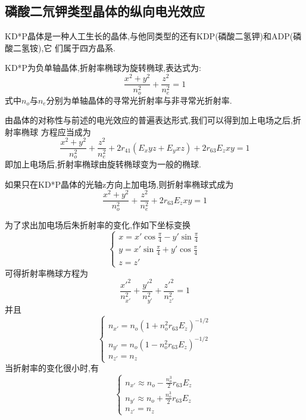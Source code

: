 \documentclass[aps,pre,12pt,preprint,onecolumn,showpacs,showkeys]{revtex4-1}
\begin{document}
\subsection{磷酸二氘钾类型晶体的纵向电光效应}

KD*P晶体是一种人工生长的晶体,与他同类型的还有KDP(磷酸二氢钾)和ADP(磷酸二氢铵),它
们属于四方晶系.

KD*P为负单轴晶体,折射率椭球为旋转椭球,表达式为:
\begin{equation}
    \frac{x^2 + y^2}{n_o^2} + \frac{z^2}{n_e^2} = 1
\end{equation}
式中$n_o$与$n_e$分别为单轴晶体的寻常光折射率与非寻常光折射率.

由晶体的对称性与前述的电光效应的普遍表达形式,我们可以得到加上电场之后,折射率椭球
方程应当成为
\begin{equation}
    \frac{x^2 + y^2}{n_o^2} + \frac{z^2}{n_e^2} + 2r_{41}(E_xyz + E_yxz) +
    2r_{63}E_zxy = 1
\end{equation}
即加上电场后,折射率椭球由旋转椭球变为一般的椭球.

如果只在KD*P晶体的光轴z方向上加电场,则折射率椭球式成为
\begin{equation}
    \frac{x^2 + y^2}{n_o^2} + \frac{z^2}{n_e^2} + 2r_{63}E_zxy = 1
\end{equation}

为了求出加电场后朱折射率的变化,作如下坐标变换
\begin{equation}
    \begin{cases}
        x = x'\cos{\frac{\pi}{4}} - y'\sin{\frac{\pi}{4}} \\
        y = x'\sin{\frac{\pi}{4}} + y'\cos{\frac{\pi}{4}} \\
        z = z'
    \end{cases}
\end{equation}
可得折射率椭球方程为
\begin{equation}
    \frac{x'^2}{n_{x'}^2} + \frac{y'^2}{n_{y'}^2} + \frac{z'^2}{n_{z'}^2} = 1
\end{equation}
并且
\begin{equation}
    \begin{cases}
        n_{x'} = n_o(1 + n_o^2r_{63}E_z)^{-1/2} \\
        n_{y'} = n_o(1 - n_o^2r_{63}E_z)^{-1/2} \\
        n_{z'} = n_z
    \end{cases}
\end{equation}
当折射率的变化很小时,有
\begin{equation}
    \begin{cases}
        n_{x'} \approx n_o - \frac{n_o^3}{2}r_{63}E_z \\
        n_{y'} \approx n_o + \frac{n_o^3}{2}r_{63}E_z \\
        n_{z'} = n_z
    \end{cases}
\end{equation}
\end{document}
